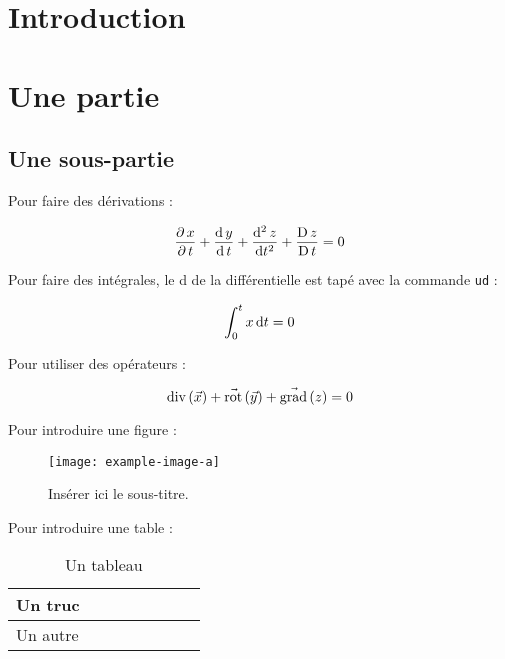 \documentclass[a4paper,12pt,french]{article}
\begin{document}
\thispagestyle{empty}
\tableofcontents


\section{Introduction}




\newpage
\section{Une partie}
\subsection{Une sous-partie}

Pour faire des dérivations :

\[
    \dfrac{\partial\, x}{\partial\, t} + \dfrac{\mathrm{d}\, y}{\mathrm{d}\, t} + \dfrac{\mathrm{d}^2\, z}{\mathrm{d} t^2} + \dfrac{\mathrm{D}\, z}{\mathrm{D}\, t} = 0
\]

Pour faire des intégrales, le d de la différentielle est tapé avec la commande \texttt{ud} :

\[
    \int_0^t x \, \mathrm{d} t = 0
\]

Pour utiliser des opérateurs :

\[
    \mathrm{div}\left( \vec{x} \right) + \vec{\mathrm{rot}}\left( \vec{y} \right) + \vec{\mathrm{grad}}\left( z \right) = 0
\]


Pour introduire une figure : 

\begin{figure}[ht!]
    \centering
    \texttt{[image: example-image-a]}
    \caption{Insérer ici le sous-titre.}
    \label{fig:id-de-la-figure}
\end{figure}


Pour introduire une table : 

\begin{table}[!ht]
\begin{center}
\begin{tabular}{@{}llllllll@{}}
\toprule
Un truc &  &  &  &  &  &  &  \\ \midrule
Un autre &  &  &  &  &  &  & \\ \bottomrule
\end{tabular}
\caption{Un tableau \label{tab:id-de-la-table}}
\end{center}
\end{table}
\end{document}
